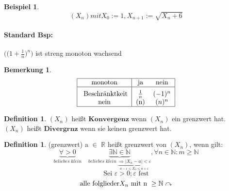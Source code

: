 \documentclass[a4paper,12pt,leqno]{report}
\theoremstyle{plain} %
\theoremstyle{definition} %
\newtheorem{remark}[theorem]{Bemerkung}
\newtheorem{definition}[theorem]{Definition}
\newtheorem{example}[theorem]{Beispiel}
\begin{document}
    \begin{example}


        \[	(X_n) mit X_0 := 1 , X_{n+1} := \sqrt{X_n +6} \]
        \paragraph{Standard Bsp:}
        $ \big( \big(1+ \frac{1}{n} \big)^n \big) $ ist streng monoton wachsend
    \end{example}
    \begin{remark}

        \[
            \begin{tabular}{|c| c c |}
                \hline
                monoton & ja & nein  \\
                \hline
                \rule{0pt}{3ex}
                Beschränktkeit & $\frac{1}{n}$ & $(-1)^n$ \\
                nein & (n) & $(n)^n$ \\
                \hline
            \end{tabular}
        \]

    \end{remark}
    \begin{definition}
        $(X_n)$ heißt $\boldsymbol{Konvergenz}$ wenn $(X_n)$ ein grenzwert hat.
        $(X_n)$ heißt $\boldsymbol{Divergrnz}$ wenn sie keinen grenzwert hat.
    \end{definition}
    \begin{definition}(grenzwert)
    a $\in$ $\mathbb{R}$ heißt grenzwert von $(X_n)$, wenn gilt:
    \[ \underbrace{\forall > 0 }_{beliebes \; klein} \quad \underbrace{\exists \mathbb{N} \in \mathbb{N}}_{beliebes \;  klein \; \underbrace{\Rightarrow |X_n -a|< \varepsilon}_{a- \varepsilon \leq X_n \leq a+\varepsilon } } , \forall n \in \mathbb{N} : m \geq \mathbb{N}  \]
    \[ \text{Sei  } \varepsilon > 0 ; \varepsilon \text{  fest} \]
    \[ \text{alle folglieder$ X_n$ mit n } \geq \mathbb{N} \curvearrowright \]


    \end{definition}
\end{document}
